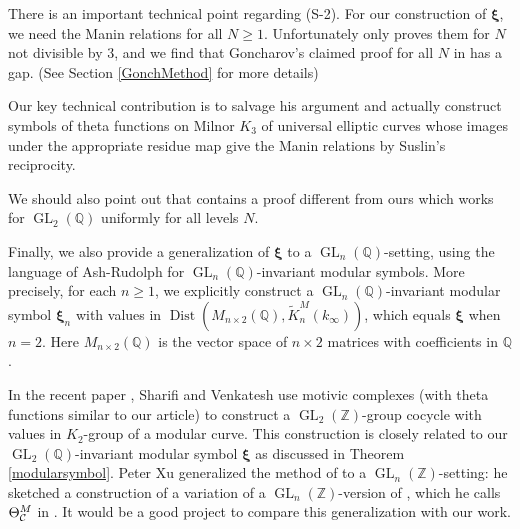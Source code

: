 \documentclass[12pt,amstex,amssymb]{article}
\theoremstyle{plain}
\theoremstyle{definition}
\def\cC{{\cal C}}
\def\Z{{\mathbb Z}}
\def\Q{{\mathbb Q}}
\newcommand{\GL}{\operatorname{GL}}
\newcommand{\Dist}{\operatorname{Dist}}
\begin{document}
There is an important technical point regarding (S-2). For our construction of ${\bm\xi}$, we need the Manin relations for all $N\geq 1$.  Unfortunately \cite[Theorem 1.4]{Bru} only proves them for $N$ not divisible by $3$, and we find that Goncharov's claimed proof for all $N$ in \cite{Gon} has a gap.  (See Section \ref{GonchMethod} for more details)

Our key technical contribution is to salvage his argument and  actually construct symbols of theta functions on Milnor $K_3$ of universal elliptic curves whose images under the appropriate residue map give the Manin relations by Suslin's reciprocity.

We should also point out that \cite{Bru2} contains a proof different from ours which works for $\GL_2(\Q)$ uniformly for all levels $N$.

Finally, we also provide a generalization of ${\bm\xi}$ to a $\GL_n(\Q)$-setting, using the language of Ash-Rudolph \cite{AR} for $\GL_n(\Q)$-invariant modular symbols. More precisely, for each $n \geq 1$, we explicitly construct a $\GL_n(\Q)$-invariant modular symbol ${\bm\xi}_n$ with values in $\Dist (M_{n\times2}(\Q), \tilde K^M_n(k_\infty))$, which equals ${\bm\xi}$ when $n=2$. Here $M_{n\times2}(\Q)$ is the vector space of $n\times 2$ matrices with coefficients in $\Q$.

In the recent paper \cite{SV}, Sharifi and Venkatesh use motivic complexes (with theta functions similar to our article) to construct a $\GL_2(\Z)$-group cocycle with values in $K_2$-group of a modular curve. This construction is  closely related to our $\GL_2(\Q)$-invariant modular symbol $\bm\xi$ as discussed in Theorem \ref{modularsymbol}. Peter Xu generalized the method of \cite{SV} to a $\GL_n(\Z)$-setting: he sketched a construction of a variation of a $\GL_n(\Z)$-version of \cite{SV}, which he calls $\Theta_{\cC}^M$ in \cite[Section 4.2.2]{Xu}. 
It would be a good project to compare this generalization with our work.
\end{document}
